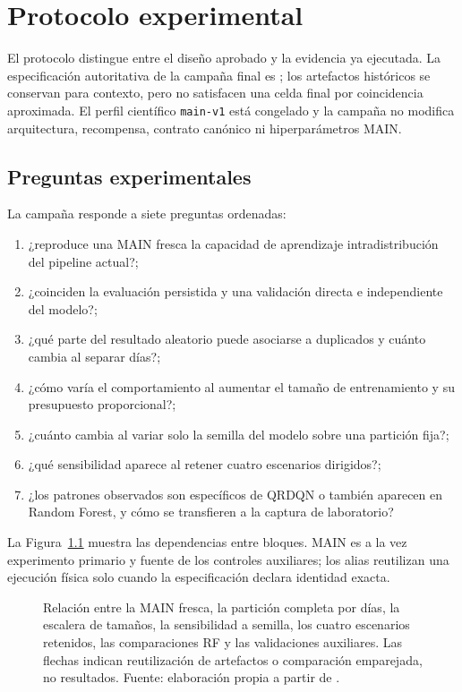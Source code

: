 \chapter{Protocolo experimental}
\label{cap:protocolo-experimental}

El protocolo distingue entre el diseño aprobado y la evidencia ya ejecutada. La especificación autoritativa de la campaña final es ; los artefactos históricos se conservan para contexto, pero no satisfacen una celda final por coincidencia aproximada. El perfil científico \texttt{main-v1} está congelado y la campaña no modifica arquitectura, recompensa, contrato canónico ni hiperparámetros MAIN.

\section{Preguntas experimentales}

La campaña responde a siete preguntas ordenadas:

\begin{enumerate}[label=\textbf{P\arabic*.},leftmargin=*]
    \item ¿reproduce una MAIN fresca la capacidad de aprendizaje intradistribución del pipeline actual?;
    \item ¿coinciden la evaluación persistida y una validación directa e independiente del modelo?;
    \item ¿qué parte del resultado aleatorio puede asociarse a duplicados y cuánto cambia al separar días?;
    \item ¿cómo varía el comportamiento al aumentar el tamaño de entrenamiento y su presupuesto proporcional?;
    \item ¿cuánto cambia al variar solo la semilla del modelo sobre una partición fija?;
    \item ¿qué sensibilidad aparece al retener cuatro escenarios dirigidos?;
    \item ¿los patrones observados son específicos de QRDQN o también aparecen en Random Forest, y cómo se transfieren a la captura de laboratorio?
\end{enumerate}

La Figura~\ref{fig:campana-final} muestra las dependencias entre bloques. MAIN es a la vez experimento primario y fuente de los controles auxiliares; los alias reutilizan una ejecución física solo cuando la especificación declara identidad exacta.

\begin{figure}[htbp]
\centering

\caption[Visión general de la campaña experimental final]{Relación entre la MAIN fresca, la partición completa por días, la escalera de tamaños, la sensibilidad a semilla, los cuatro escenarios retenidos, las comparaciones RF y las validaciones auxiliares. Las flechas indican reutilización de artefactos o comparación emparejada, no resultados. Fuente: elaboración propia a partir de .}
\label{fig:campana-final}
\end{figure}

